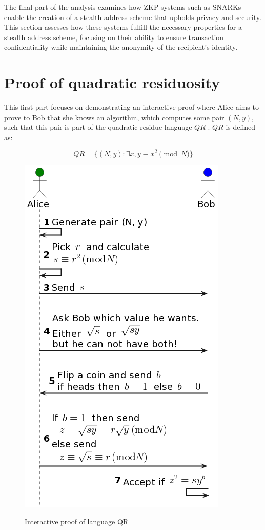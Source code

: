 The final part of the analysis examines how ZKP systems such as SNARKs enable
the creation of a stealth address scheme that upholds privacy and security.
This section assesses how these systems fulfill the necessary properties for a
stealth address scheme, focusing on their ability to ensure transaction
confidentiality while maintaining the anonymity of the recipient's identity.

\section{Proof of quadratic residuosity}

This first part focuses on demonstrating an interactive proof where Alice aims
to prove to Bob that she knows an algorithm, which computes some pair $(N, y)$,
such that this pair is part of the quadratic residue language $QR$ \cite{Goldwasser1989}.
$QR$ is defined as:

\[QR = \lbrace(N, y): \exists x, y \equiv x^2 \pmod{N}\rbrace\]

\begin{figure}[h!]
    \centering
    \includegraphics[scale=0.6]{assets/images/qr_ip.png}
    \caption{Interactive proof of language QR}
	\cite{Goldwasser1989, youtubeMOOCLecture1}
    \label{fig:qr_ip}
    \vspace{0.5cm}
\end{figure}

